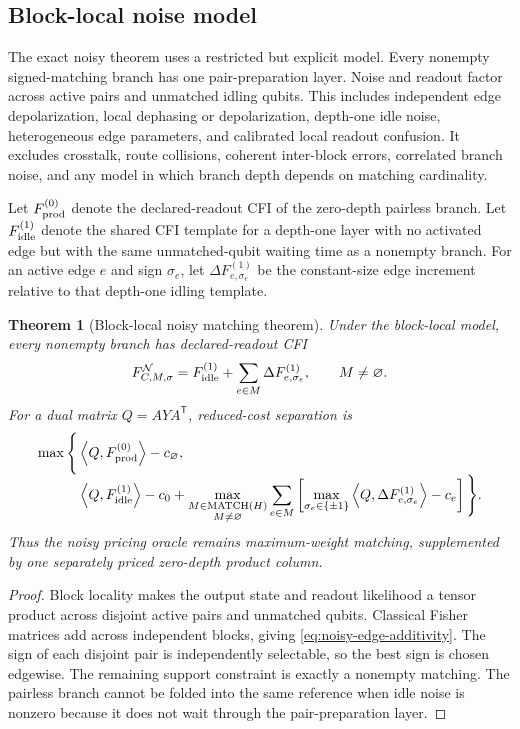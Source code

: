 \documentclass[11pt]{article}
\newtheorem{theorem}{Theorem}[section]
\theoremstyle{definition}
\theoremstyle{remark}
\newcommand{\MATCH}{\operatorname{MATCH}}
\newcommand{\inner}[2]{\left\langle #1,#2\right\rangle}
\begin{document}
\subsection{Block-local noise model}
The exact noisy theorem uses a restricted but explicit model. Every nonempty signed-matching branch has one pair-preparation layer. Noise and readout factor across active pairs and unmatched idling qubits. This includes independent edge depolarization, local dephasing or depolarization, depth-one idle noise, heterogeneous edge parameters, and calibrated local readout confusion. It excludes crosstalk, route collisions, coherent inter-block errors, correlated branch noise, and any model in which branch depth depends on matching cardinality.

Let $F_{\rm prod}^{(0)}$ denote the declared-readout CFI of the zero-depth pairless branch. Let $F_{\rm idle}^{(1)}$ denote the shared CFI template for a depth-one layer with no activated edge but with the same unmatched-qubit waiting time as a nonempty branch. For an active edge $e$ and sign $\sigma_e$, let $\Delta F_{e,\sigma_e}^{(1)}$ be the constant-size edge increment relative to that depth-one idling template.

\begin{theorem}[Block-local noisy matching theorem]
\label{thm:noisy-matching}
Under the block-local model, every nonempty branch has declared-readout CFI
\begin{equation}
  F_{C,M,\sigma}^{\mathcal N}
  =F_{\rm idle}^{(1)}
   +\sum_{e\in M}\Delta F_{e,\sigma_e}^{(1)},
  \qquad M\ne\varnothing.
  \label{eq:noisy-edge-additivity}
\end{equation}
For a dual matrix $Q=AYA^{\mathsf T}$, reduced-cost separation is
\begin{align}
  \max\Bigg\{&
  \inner{Q}{F_{\rm prod}^{(0)}}-c_{\varnothing},\notag\\[-0.4em]
  &\inner{Q}{F_{\rm idle}^{(1)}}-c_0
  +\max_{\substack{M\in\MATCH(H)\\M\ne\varnothing}}
  \sum_{e\in M}
  \left[
    \max_{\sigma_e\in\{\pm1\}}
    \inner{Q}{\Delta F_{e,\sigma_e}^{(1)}}-c_e
  \right]
  \Bigg\}.
  \label{eq:noisy-pricing}
\end{align}
Thus the noisy pricing oracle remains maximum-weight matching, supplemented by one separately priced zero-depth product column.
\end{theorem}

\begin{proof}
Block locality makes the output state and readout likelihood a tensor product across disjoint active pairs and unmatched qubits. Classical Fisher matrices add across independent blocks, giving \cref{eq:noisy-edge-additivity}. The sign of each disjoint pair is independently selectable, so the best sign is chosen edgewise. The remaining support constraint is exactly a nonempty matching. The pairless branch cannot be folded into the same reference when idle noise is nonzero because it does not wait through the pair-preparation layer.
\end{proof}
\end{document}
